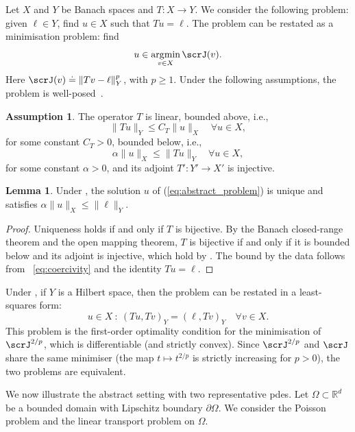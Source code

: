 \documentclass[oneside,reqno,11pt,a4paper]{amsart}
\theoremstyle{definition}
\newtheorem{assumption}{Assumption}[section]
\newtheorem{lemma}{Lemma}[section]
\DeclareMathOperator*{\argmin}{\arg\!\min}
\begin{document}
Let $X$ and $Y$ be Banach spaces and $T:X \rightarrow Y$. We consider the
following problem: given $\ell \in Y$, find $u \in X$ such that $Tu = \ell$. The
problem can be restated as a minimisation problem: find
\begin{equation}\label{eq:abstract_problem}
  u \in \argmin_{v \in X} \scrJ(v).
\end{equation}
Here $\scrJ(v) \doteq \| T v - \ell \|_Y^p$, with $p \geq 1$. Under the
following assumptions, the problem is well-posed~\cite{GuermondLp2004}.
\begin{assumption}\label{assumption:well-posed}
  The operator $T$ is linear, bounded above, i.e.,
  \begin{equation}\label{eq:boundedness}
    \|Tu\|_Y \leq C_T \|u\|_X \quad \forall u \in X,
  \end{equation}
  for some constant $C_T > 0$, bounded below, i.e.,
  \begin{equation}\label{eq:coercivity}
    \alpha \|u\|_X \leq \|Tu\|_Y \quad \forall u \in X,
  \end{equation}
  for some constant $\alpha > 0$, and its adjoint $T' : Y' \rightarrow X'$ is injective. 
\end{assumption}
\begin{lemma}
  Under , the solution $u$ of (\ref{eq:abstract_problem}) is unique and satisfies $\alpha \|u\|_X \leq \|\ell\|_Y$.
\end{lemma}
\begin{proof}
  Uniqueness holds if and only if $T$ is bijective. By the Banach closed-range
  theorem and the open mapping theorem, $T$ is bijective if and only if it is
  bounded below and its adjoint is injective, which hold by . The bound by the data follows from
 ~\eqref{eq:coercivity} and the identity $Tu = \ell$.
  \end{proof} 
  
  Under , if $Y$ is a Hilbert space, then the problem can be restated in a least-squares form:
  \[
    u \in X \ : \ (Tu,Tv)_Y = (\ell,Tv)_Y \quad \forall v \in X.
  \]
  This problem is the first-order optimality condition for the minimisation of $\scrJ^{2/p}$, which is differentiable (and strictly convex). Since $\scrJ^{2/p}$ and $\scrJ$ share the same minimiser (the map $t \mapsto t^{2/p}$ is strictly increasing for $p>0$), the two problems are equivalent.  
  
We now illustrate the abstract setting with two representative \acp{pde}. Let
$\Omega \subset \mathbb{R}^d$ be a bounded domain with Lipschitz boundary
$\partial \Omega$. We consider the Poisson problem and the linear transport
problem on $\Omega$. 
\end{document}
